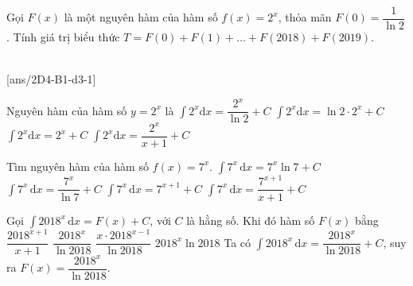 \begin{vd} 
	Gọi $F(x)$ là một nguyên hàm của hàm số $f(x)=2^x$, thỏa mãn $F(0)=\dfrac{1}{\ln 2}$. Tính giá trị biểu thức $T=F(0)+F(1)+\ldots+F(2018)+F(2019)$.
\end{vd}
 \\
[ans/2D4-B1-d3-1]
\setcounter{ex}{0}
\begin{ex}%
	Nguyên hàm của hàm số $y=2^x$ là
	\choice
	{\True $\displaystyle\int 2^x\mathrm{d}x=\dfrac{2^x}{\ln 2}+C$}
	{$\displaystyle\int 2^x\mathrm{d}x=\ln 2\cdot 2^x+C$}
	{$\displaystyle\int 2^x\mathrm{d}x=2^x+C$}
	{$\displaystyle\int 2^x\mathrm{d}x=\dfrac{2^x}{x+1}+C$}
\end{ex}

\begin{ex}
	Tìm nguyên hàm của hàm số $f\left(x\right)=7^x$.
	\choice %
	{$ \displaystyle \int 7^x \mathrm{\,d}x =7^x \ln7+C $}
	{\True $ \displaystyle \int 7^x \mathrm{\,d}x =\dfrac{7^x}{\ln7}+C $}
	{$ \displaystyle \int 7^x \mathrm{\,d}x =7^{x+1} +C $}
	{$ \displaystyle \int 7^x \mathrm{\,d}x =\dfrac{7^{x+1}}{x+1}+C $}
	\loigiai{
	}
\end{ex}

\begin{ex}
	Gọi $\displaystyle\int 2018^x\mathrm{\,d}x=F(x)+C$, với $C$ là hằng số. Khi đó hàm số $F(x)$ bằng
	\choice
	{$\dfrac{2018^{x+1}}{x+1}$}
	{\True $\dfrac{2018^x}{\ln2018}$}
	{$\dfrac{x\cdot2018^{x-1}}{\ln2018}$}
	{$2018^x\ln2018$}
	\loigiai
	{
		Ta có $\displaystyle\int 2018^x\mathrm{\,d}x=\dfrac{2018^x}{\ln2018}+C$, suy ra $F(x)=\dfrac{2018^x}{\ln2018}$.
	}
\end{ex}

